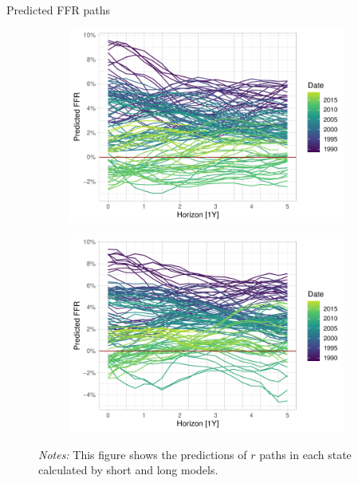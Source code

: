 \documentclass[10pt,aspectratio=169]{beamer}
\begin{document}
\begin{frame}{Predicted FFR paths}
    \begin{figure}[!htbp]\centering
        \begin{minipage}{\textwidth}
            \caption{}
            \label{fig:predicted_paths}
            \begin{subfigure}[b]{0.49\textwidth}
                \includegraphics[width=\linewidth]{predicted_ffr_paths_short.pdf}
            \end{subfigure}%
            \begin{subfigure}[b]{0.49\textwidth}
          \includegraphics[width=\linewidth]{predicted_ffr_paths_long.pdf}
        \end{subfigure}
          {\begin{flushleft}\tiny \textit{Notes:} This figure shows the predictions of $r$ paths in each state calculated by short and long models.\end{flushleft}} 
          \end{minipage}
      \end{figure}
\end{frame}
\end{document}
